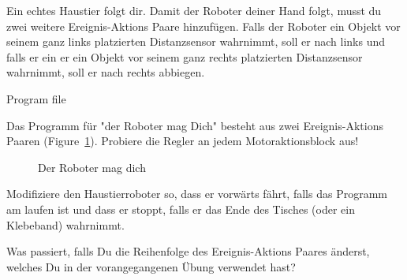 
Ein echtes Haustier folgt dir.
Damit der Roboter deiner Hand folgt,
musst du zwei weitere Ereignis-Aktions Paare hinzufügen.
Falls der Roboter ein Objekt vor seinem
ganz links platzierten Distanzsensor wahrnimmt,
soll er nach links und falls er ein er ein Objekt
vor seinem ganz rechts platzierten Distanzsensor wahrnimmt, soll er nach rechts abbiegen.

{\raggedleft \hfill Program file }

Das Programm für "der Roboter mag Dich" besteht aus zwei Ereignis-Aktions Paaren
(Figure~\ref{fig.likes}).
Probiere die Regler an jedem Motoraktionsblock aus!

\begin{figure}
\begin{center}
\caption{Der Roboter mag dich}
\label{fig.likes}
\end{center}
\end{figure}


Modifiziere den Haustierroboter so,
dass er vorwärts fährt, falls das Programm am laufen ist
und dass er stoppt, falls er das Ende des Tisches (oder ein Klebeband) wahrnimmt.


Was passiert, falls Du die Reihenfolge des Ereignis-Aktions Paares änderst, 
welches Du in der vorangegangenen Übung verwendet hast?



